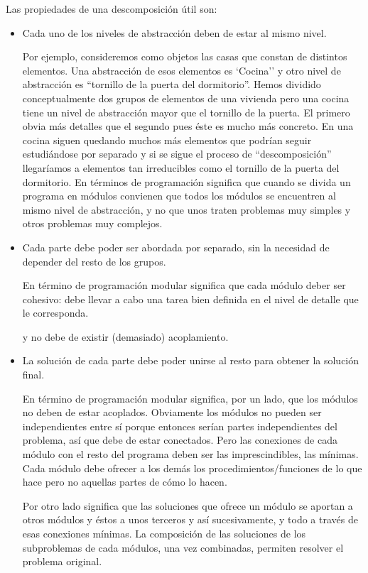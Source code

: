 Las propiedades de una descomposición útil son:
\begin{itemize}
\item Cada uno de los niveles de abstracción  deben de estar al mismo nivel. 

Por ejemplo, consideremos como objetos las casas que constan de distintos elementos. Una abstracción de esos elementos es `Cocina'' y otro nivel de abstracción es ``tornillo de la puerta del dormitorio''. Hemos dividido conceptualmente dos grupos de elementos de una vivienda pero una cocina tiene un nivel de abstracción mayor que el tornillo de la puerta. El primero obvia más detalles que el segundo pues éste es mucho más concreto. En una cocina siguen quedando muchos más elementos que podrían seguir estudiándose por separado y si se sigue el proceso de ``descomposición'' llegaríamos a elementos tan irreducibles como el tornillo de la puerta del dormitorio. En términos de programación significa que cuando se divida un programa en módulos convienen que todos los módulos se encuentren al mismo nivel de abstracción, y no que unos traten problemas muy simples y otros problemas muy complejos. 

\item Cada parte debe poder ser abordada por separado, sin la necesidad de depender del resto de los grupos. 

En término de programación modular significa que cada módulo deber ser cohesivo: debe llevar a cabo una tarea bien definida en el nivel de detalle que le corresponda.


 y no debe de existir (demasiado) acoplamiento.

\item La solución de cada parte debe poder unirse al resto para obtener la solución final.

En término de programación modular significa, por un lado, que los módulos no deben de estar acoplados. Obviamente los módulos no pueden ser independientes entre sí porque entonces serían partes independientes del problema, así que debe de estar conectados. Pero las conexiones de cada módulo con el resto del programa deben ser las imprescindibles, las mínimas. Cada módulo debe ofrecer a los demás los procedimientos/funciones de lo que hace pero no aquellas partes de cómo lo hacen. 

Por otro lado significa que las soluciones que ofrece un módulo se aportan a otros módulos y éstos a unos terceros y así sucesivamente, y todo a través de esas conexiones mínimas. La composición de las soluciones de los subproblemas de cada módulos, una vez combinadas, permiten resolver el problema original.

\end{itemize}



